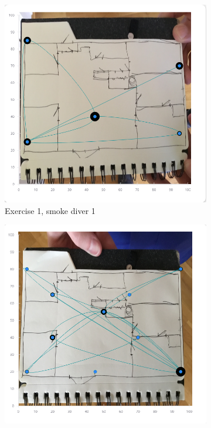 \documentclass[../Main/thesis.tex]{subfiles}
\begin{document}
\begin{figure}[h]
	\centering
	\begin{subfigure}{0.3\textwidth}
		\includegraphics[width=\textwidth]{../fig/eval_1_remi}
		\caption{Exercise 1, smoke diver 1}
		\label{fig:visualization-1-1}
	\end{subfigure}
	\begin{subfigure}{0.3\textwidth}
		\includegraphics[width=\textwidth]{../fig/eval_2_remi}

\end{subfigure}
\end{figure}
\end{document}
